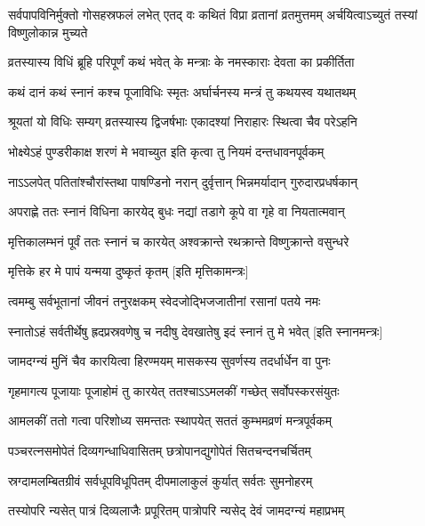 \threelineshloka
{सर्वपापविनिर्मुक्तो गोसहस्रफलं लभेत्}
{एतद् वः कथितं विप्रा व्रतानां व्रतमुत्तमम्}
{अर्चयित्वाऽच्युतं तस्यां विष्णुलोकान्न मुच्यते}%


\twolineshloka
{व्रतस्यास्य विधिं ब्रूहि परिपूर्णं कथं भवेत्}
{के मन्त्राः के नमस्काराः देवता का प्रकीर्तिता}%

\twolineshloka
{कथं दानं कथं स्नानं कश्च पूजाविधिः स्मृतः}
{अर्घार्चनस्य मन्त्रं तु कथयस्व यथातथम्}%


\twolineshloka
{श्रूयतां यो विधिः सम्यग् व्रतस्यास्य द्विजर्षभाः}
{एकादश्यां निराहारः स्थित्वा चैव परेऽहनि}%

\twolineshloka
{भोक्ष्येऽहं पुण्डरीकाक्ष शरणं मे भवाच्युत}
{इति कृत्वा तु नियमं दन्तधावनपूर्वकम्}%

\twolineshloka
{नाऽऽलपेत् पतितांश्चौरांस्तथा पाषण्डिनो नरान्}
{दुर्वृत्तान् भिन्नमर्यादान् गुरुदारप्रधर्षकान्}%

\twolineshloka
{अपराह्णे ततः स्नानं विधिना कारयेद् बुधः}
{नद्यां तडागे कूपे वा गृहे वा नियतात्मवान्}%

\twolineshloka
{मृत्तिकालम्भनं पूर्वं ततः स्नानं च कारयेत्}
{अश्वक्रान्ते रथक्रान्ते विष्णुक्रान्ते वसुन्धरे}%

\onelineshloka
{मृत्तिके हर मे पापं यन्मया दुष्कृतं कृतम्}%
[इति मृत्तिकामन्त्रः]

\twolineshloka
{त्वमम्बु सर्वभूतानां जीवनं तनुरक्षकम्}
{स्वेदजोद्भिजजातीनां रसानां पतये नमः}%

\twolineshloka
{स्नातोऽहं सर्वतीर्थेषु ह्रदप्रस्रवणेषु च}
{नदीषु देवखातेषु इदं स्नानं तु मे भवेत्}%
[इति स्नानमन्त्रः]

\twolineshloka
{जामदग्न्यं मुनिं चैव कारयित्वा हिरण्मयम्}
{मासकस्य सुवर्णस्य तदर्धार्धेन वा पुनः}%

\twolineshloka
{गृहमागत्य पूजायाः पूजाहोमं तु कारयेत्}
{ततश्चाऽऽमलकीं गच्छेत् सर्वोपस्करसंयुतः}%

\twolineshloka
{आमलकीं ततो गत्वा परिशोध्य समन्ततः}
{स्थापयेत् सततं कुम्भमव्रणं मन्त्रपूर्वकम्}%

\twolineshloka
{पञ्चरत्नसमोपेतं दिव्यगन्धाधिवासितम्}
{छत्रोपानद्युगोपेतं सितचन्दनचर्चितम्}%

\twolineshloka
{स्रग्दामलम्बितग्रीवं सर्वधूपविधूपितम्}
{दीपमालाकुलं कुर्यात् सर्वतः सुमनोहरम्}%

\twolineshloka
{तस्योपरि न्यसेत् पात्रं दिव्यलाजैः प्रपूरितम्}
{पात्रोपरि न्यसेद् देवं जामदग्न्यं महाप्रभम्}%

